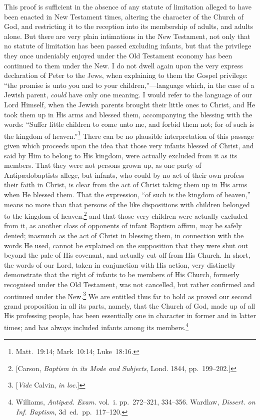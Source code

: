 \documentclass[
]{book}
\begin{document}
This proof is sufficient in the absence of any statute of limitation alleged to have been enacted in New Testament times, altering the character of the Church of God, and restricting it to the reception into its membership of adults, and adults alone. But there are very plain intimations in the New Testament, not only that no statute of limitation has been passed excluding infants, but that the privilege they once undeniably enjoyed under the Old Testament economy has been continued to them under the New. I do not dwell again upon the very express declaration of Peter to the Jews, when explaining to them the Gospel privilege: ``the promise is unto you and to your children,''---language which, in the case of a Jewish parent, \emph{could} have only one meaning. I would refer to the language of our Lord Himself, when the Jewish parents brought their little ones to Christ, and He took them up in His arms and blessed them, accompanying the blessing with the words: ``Suffer little children to come unto me, and forbid them not; for of such is the kingdom of heaven.''\footnote{Matt.~19:14; Mark~10:14; Luke~18:16.} There can be no plausible interpretation of this passage given which proceeds upon the idea that those very infants blessed of Christ, and said by Him to belong to His kingdom, were actually excluded from it as its members. That they were not persons grown up, as one party of Antipædobaptists allege, but infants, who could by no act of their own profess their faith in Christ, is clear from the act of Christ taking them up in His arms when He blessed them. That the expression, ``of such is the kingdom of heaven,'' means no more than that persons of the like dispositions with children belonged to the kingdom of heaven,\footnote{{[}Carson, \emph{Baptism in its Mode and Subjects}, Lond. 1844, pp.~199--202.{]}} and that those very children were actually excluded from it, as another class of opponents of infant Baptism affirm, may be safely denied; inasmuch as the act of Christ in blessing them, in connection with the words He used, cannot be explained on the supposition that they were shut out beyond the pale of His covenant, and actually cut off from His Church. In short, the words of our Lord, taken in conjunction with His action, very distinctly demonstrate that the right of infants to be members of His Church, formerly recognised under the Old Testament, was not cancelled, but rather confirmed and continued under the New.\footnote{{[}\emph{Vide} Calvin, \emph{in loc.}{]}} We are entitled thus far to hold as proved our second grand proposition in all its parts, namely, that the Church of God, made up of all His professing people, has been essentially one in character in former and in latter times; and has always included infants among its members.\footnote{Williams, \emph{Antipæd. Exam.} vol.~i. pp.~272--321, 334--356. Wardlaw, \emph{Dissert. on Inf. Baptism}, 3d~ed.~pp.~117--120.}
\end{document}
